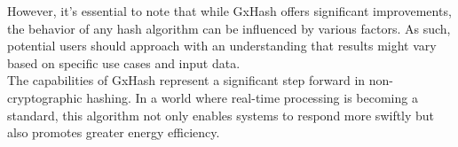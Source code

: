 \documentclass[10pt]{article}
\begin{document}
However, it's essential to note that while GxHash offers significant improvements, the behavior of any hash algorithm can be influenced by various factors. As such, potential users should approach with an understanding that results might vary based on specific use cases and input data.\\

The capabilities of GxHash represent a significant step forward in non-cryptographic hashing. In a world where real-time processing is becoming a standard, this algorithm not only enables systems to respond more swiftly but also promotes greater energy efficiency.



\end{document}
